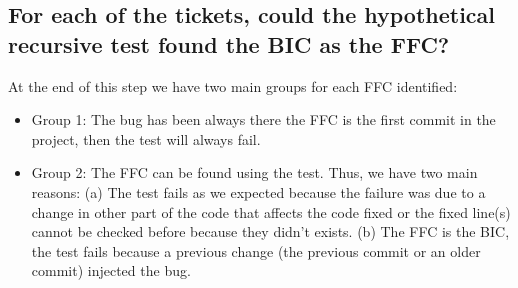 \documentclass[conference]{IEEEtran}
\begin{document}
%


\subsection{For each of the tickets, could the hypothetical recursive test found the BIC as the FFC?}

At the end of this step we have two main groups for each FFC identified:
\begin{itemize}
	\item Group 1: The bug has been always there the FFC is the first commit in the project, then the test will always fail.
	\item Group 2: The FFC can be found using the test. Thus, we have two main reasons: (a) The test fails as we expected because the failure was due to a change in other part of the code that affects the code fixed or the fixed line(s) cannot be checked before because they didn't exists. (b) The FFC is the BIC, the test fails because a previous change (the previous commit or an older commit) injected the bug.
\end{itemize}

\end{document}
